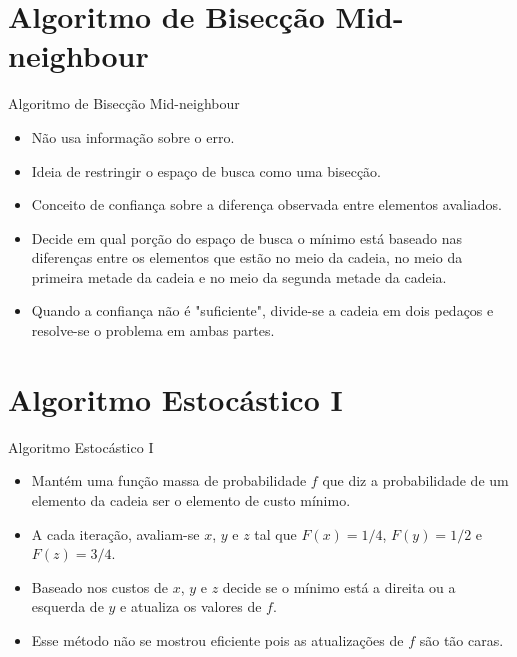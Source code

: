 \documentclass{beamer}
\begin{document}
\section{Algoritmo de Bisecção Mid-neighbour}
\begin{frame}{Algoritmo de Bisecção Mid-neighbour}
    \begin{itemize}
        \item{Não usa informação sobre o erro.}
        \item{Ideia de restringir o espaço de busca como uma 
            bisecção.}
        \item{Conceito de confiança sobre a diferença observada entre
            elementos avaliados.}
        \item{Decide em qual porção do espaço de busca o mínimo está
            baseado nas diferenças entre os elementos que estão no meio
            da cadeia, no meio da primeira metade da cadeia e no meio da 
            segunda metade da cadeia.}
        \item{Quando a confiança não é "suficiente", divide-se a cadeia
            em dois pedaços e resolve-se o problema em ambas partes.}
    \end{itemize}
\end{frame}

\section{Algoritmo Estocástico I}
\begin{frame}{Algoritmo Estocástico I}
    \begin{itemize}
        \item{Mantém uma função massa de probabilidade $f$ que diz a
            probabilidade de um elemento da cadeia ser o elemento de
            custo mínimo.}
        \item{A cada iteração, avaliam-se $x$, $y$ e $z$ tal que 
            $F (x)= 1 / 4$, $F (y) = 1 / 2$ e $F (z) = 3 / 4$.}
        \item{Baseado nos custos de $x$, $y$ e $z$ decide se o 
            mínimo está a direita ou a esquerda de $y$ e atualiza os
            valores de $f$.}
        \item{Esse método não se mostrou eficiente pois as atualizações
            de $f$ são tão caras.}
    \end{itemize}
\end{frame}
\end{document}
